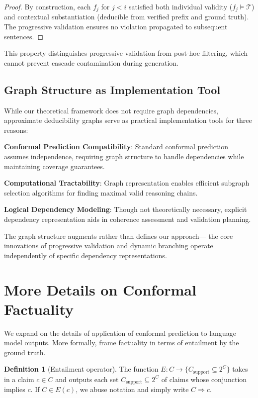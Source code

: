 \documentclass{uai2026} %
\theoremstyle{remark}
\theoremstyle{plain}
\theoremstyle{definition}
\newtheorem{definition}[theorem]{Definition}
\begin{document}
\begin{proof}
By construction, each $f_j$ for $j < i$ satisfied both individual validity ($f_j \models \mathcal{T}$) and contextual substantiation (deducible from verified prefix and ground truth). The progressive validation ensures no violation propagated to subsequent sentences.
\end{proof}

This property distinguishes progressive validation from post-hoc filtering, which cannot prevent cascade contamination during generation.

\subsection{Graph Structure as Implementation Tool}

While our theoretical framework does not require graph dependencies, approximate deducibility graphs serve as practical implementation tools for three reasons:

\textbf{Conformal Prediction Compatibility}: Standard conformal prediction assumes independence, requiring graph structure to handle dependencies while maintaining coverage guarantees.

\textbf{Computational Tractability}: Graph representation enables efficient subgraph selection algorithms for finding maximal valid reasoning chains.

\textbf{Logical Dependency Modeling}: Though not theoretically necessary, explicit dependency representation aids in coherence assessment and validation planning.

The graph structure augments rather than defines our approach—
the core innovations of progressive validation and dynamic branching operate independently of specific dependency representations.

\section{More Details on Conformal Factuality}
\label{app:mohri_details}

We expand on the details of \citet{mohri2024language} application of conformal prediction to language model outputs. More formally, \citet{mohri2024language} frame factuality in terms of entailment by the ground truth.

\begin{definition}[Entailment operator]
The function $E : C \rightarrow \{C_{\text{support}} \subseteq 2^C\}$ takes in a claim $c \in C$ and outputs each set $C_{\text{support}} \subseteq 2^C$ of claims whose conjunction implies $c$. If $C \in E(c)$, we abuse notation and simply write $C \Rightarrow c$.
\end{definition}
\end{document}
